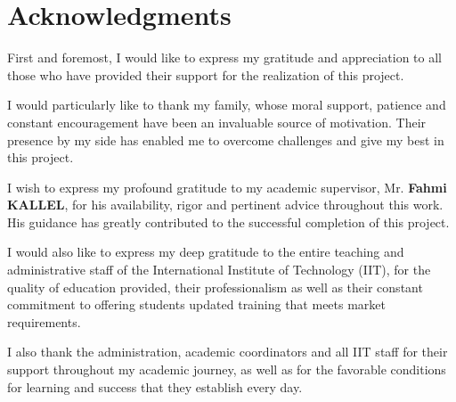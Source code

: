 \chapter*{Acknowledgments}
\justifying
\sloppy

First and foremost, I would like to express my gratitude and appreciation to all those  
who have provided their support for the realization of this project.

\vspace{0.5cm}

I would particularly like to thank my family, whose moral support, patience and  
constant encouragement have been an invaluable source of motivation. Their presence by  
my side has enabled me to overcome challenges and give my best in this  
project.

\vspace{0.5cm}

I wish to express my profound gratitude to my academic supervisor, Mr. \textbf{Fahmi KALLEL},  
for his availability, rigor and pertinent advice throughout this work.  
His guidance has greatly contributed to the successful completion of this project.

\vspace{0.5cm}

I would also like to express my deep gratitude to the entire teaching and administrative staff of the International Institute of Technology (IIT), for the quality of education provided, their professionalism as well as their constant commitment to offering students updated training that meets market requirements.

\vspace{0.5cm}

I also thank the administration, academic coordinators and all IIT staff for their support throughout my academic journey, as well as for the favorable conditions for learning and success that they establish every day.